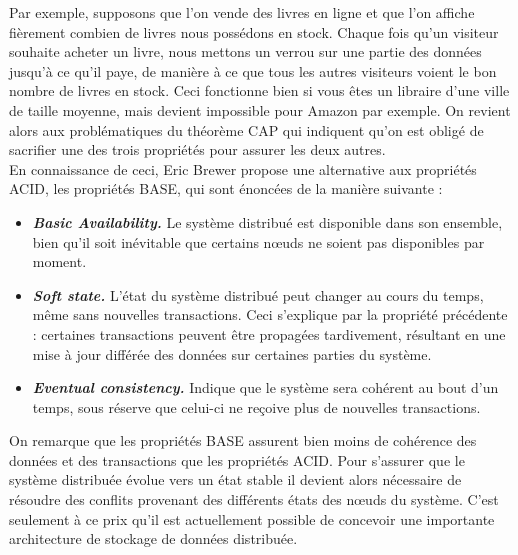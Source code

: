 	Par exemple, supposons que l'on vende des livres en ligne et que l'on affiche fièrement combien de livres nous possédons en stock. Chaque fois qu'un visiteur souhaite acheter un livre, nous mettons un verrou sur une partie des données jusqu'à ce qu'il paye, de manière à ce que tous les autres visiteurs voient le bon nombre de livres en stock. Ceci fonctionne bien si vous êtes un libraire d'une ville de taille moyenne, mais devient impossible pour Amazon par exemple. On revient alors aux problématiques du théorème CAP qui indiquent qu'on est obligé de sacrifier une des trois propriétés pour assurer les deux autres.\\

	En connaissance de ceci, Eric Brewer propose une alternative aux propriétés ACID, les propriétés BASE, qui sont énoncées de la manière suivante :
	\vspace{10px}
	\begin{itemize}
	 	\item \textbf{\textit{Basic Availability.}} Le système distribué est disponible dans son ensemble, bien qu'il soit inévitable que certains nœuds ne soient pas disponibles par moment.
	 	\item \textbf{\textit{Soft state.}} L'état du système distribué peut changer au cours du temps, même sans nouvelles transactions. Ceci s'explique par la propriété précédente : certaines transactions peuvent être propagées tardivement, résultant en une mise à jour différée des données sur certaines parties du système.
	 	\item \textbf{\textit{Eventual consistency.}} Indique que le système sera cohérent au bout d'un temps, sous réserve que celui-ci ne reçoive plus de nouvelles transactions.
	 \end{itemize}
	 \vspace{20px}
	 On remarque que les propriétés BASE assurent bien moins de cohérence des données et des transactions que les propriétés ACID. Pour s'assurer que le système distribuée évolue vers un état stable il devient alors nécessaire de résoudre des conflits provenant des différents états des nœuds du système. C'est seulement à ce prix qu'il est actuellement possible de concevoir une importante architecture de stockage de données distribuée.